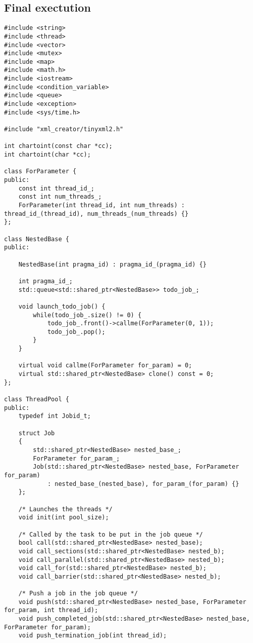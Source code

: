 \documentclass[a4paper,11pt,twoside]{book}
\begin{document}
\subsection{Final exectution}
\begin{lstlisting}[language=CCC, caption=thread\_pool.h]
#include <string>
#include <thread>
#include <vector>
#include <mutex>
#include <map>
#include <math.h>
#include <iostream>
#include <condition_variable>
#include <queue>
#include <exception>
#include <sys/time.h>

#include "xml_creator/tinyxml2.h"

int chartoint(const char *cc);
int chartoint(char *cc);

class ForParameter {
public:
    const int thread_id_;
    const int num_threads_;
    ForParameter(int thread_id, int num_threads) : thread_id_(thread_id), num_threads_(num_threads) {}
};

class NestedBase {
public:

    NestedBase(int pragma_id) : pragma_id_(pragma_id) {}
    
    int pragma_id_;
    std::queue<std::shared_ptr<NestedBase>> todo_job_;

    void launch_todo_job() {
        while(todo_job_.size() != 0) {
            todo_job_.front()->callme(ForParameter(0, 1));
            todo_job_.pop();
        }
    }
    
    virtual void callme(ForParameter for_param) = 0;
    virtual std::shared_ptr<NestedBase> clone() const = 0;
};

class ThreadPool {
public:
    typedef int Jobid_t;

    struct Job
    {
        std::shared_ptr<NestedBase> nested_base_;
        ForParameter for_param_;
        Job(std::shared_ptr<NestedBase> nested_base, ForParameter for_param)
            : nested_base_(nested_base), for_param_(for_param) {}
    };

    /* Launches the threads */
    void init(int pool_size);

    /* Called by the task to be put in the job queue */
    bool call(std::shared_ptr<NestedBase> nested_base);
    void call_sections(std::shared_ptr<NestedBase> nested_b);
    void call_parallel(std::shared_ptr<NestedBase> nested_b);
    void call_for(std::shared_ptr<NestedBase> nested_b);
    void call_barrier(std::shared_ptr<NestedBase> nested_b);

    /* Push a job in the job queue */
    void push(std::shared_ptr<NestedBase> nested_base, ForParameter for_param, int thread_id);
    void push_completed_job(std::shared_ptr<NestedBase> nested_base, ForParameter for_param);
    void push_termination_job(int thread_id);


\end{lstlisting}
\end{document}

